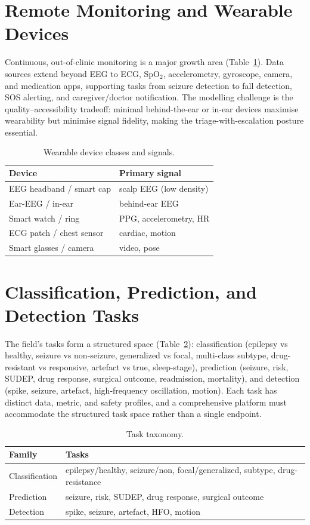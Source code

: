 \section{Remote Monitoring and Wearable Devices}
Continuous, out-of-clinic monitoring is a major growth area (Table~\ref{tab:wear}). Data sources extend beyond EEG to ECG, SpO$_2$, accelerometry, gyroscope, camera, and medication apps, supporting tasks from seizure detection to fall detection, SOS alerting, and caregiver/doctor notification. The modelling challenge is the quality--accessibility tradeoff: minimal behind-the-ear or in-ear devices maximise wearability but minimise signal fidelity, making the triage-with-escalation posture essential.
\begin{table}[t]\centering\caption{Wearable device classes and signals.}\label{tab:wear}
\footnotesize\begin{tabular}{ll}\toprule
Device & Primary signal\\\midrule
EEG headband / smart cap & scalp EEG (low density)\\
Ear-EEG / in-ear & behind-ear EEG\\
Smart watch / ring & PPG, accelerometry, HR\\
ECG patch / chest sensor & cardiac, motion\\
Smart glasses / camera & video, pose\\\bottomrule
\end{tabular}\end{table}

\section{Classification, Prediction, and Detection Tasks}
The field's tasks form a structured space (Table~\ref{tab:tasks3}): classification (epilepsy vs healthy, seizure vs non-seizure, generalized vs focal, multi-class subtype, drug-resistant vs responsive, artefact vs true, sleep-stage), prediction (seizure, risk, SUDEP, drug response, surgical outcome, readmission, mortality), and detection (spike, seizure, artefact, high-frequency oscillation, motion). Each task has distinct data, metric, and safety profiles, and a comprehensive platform must accommodate the structured task space rather than a single endpoint.
\begin{table}[t]\centering\caption{Task taxonomy.}\label{tab:tasks3}
\footnotesize\begin{tabular}{ll}\toprule
Family & Tasks\\\midrule
Classification & epilepsy/healthy, seizure/non, focal/generalized, subtype, drug-resistance\\
Prediction & seizure, risk, SUDEP, drug response, surgical outcome\\
Detection & spike, seizure, artefact, HFO, motion\\\bottomrule
\end{tabular}\end{table}

